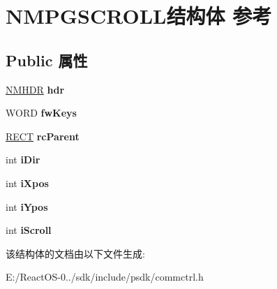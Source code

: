 \hypertarget{struct_n_m_p_g_s_c_r_o_l_l}{}\section{N\+M\+P\+G\+S\+C\+R\+O\+L\+L结构体 参考}
\label{struct_n_m_p_g_s_c_r_o_l_l}
\subsection*{Public 属性}
\begin{DoxyCompactItemize}
\item 
\mbox{\label{struct_n_m_p_g_s_c_r_o_l_l_ae7c7c149c351f461de64fbb294d3bf6d}} 
\hyperlink{structtag_n_m_h_d_r}{N\+M\+H\+DR} {\bfseries hdr}
\item 
\mbox{\label{struct_n_m_p_g_s_c_r_o_l_l_a29cd28194be55f1b6ce7b4878edfa7b0}} 
W\+O\+RD {\bfseries fw\+Keys}
\item 
\mbox{\label{struct_n_m_p_g_s_c_r_o_l_l_a5d3d8c6729d978379c85c202d4b8427a}} 
\hyperlink{structtag_r_e_c_t}{R\+E\+CT} {\bfseries rc\+Parent}
\item 
\mbox{\label{struct_n_m_p_g_s_c_r_o_l_l_a08a0e51293fcef8cfd11e1b382b77cfc}} 
int {\bfseries i\+Dir}
\item 
\mbox{\label{struct_n_m_p_g_s_c_r_o_l_l_a4f5b4a20877e8ad2859f748602fb930d}} 
int {\bfseries i\+Xpos}
\item 
\mbox{\label{struct_n_m_p_g_s_c_r_o_l_l_a137906aae037c521e8c68dbf08a34ac7}} 
int {\bfseries i\+Ypos}
\item 
\mbox{\label{struct_n_m_p_g_s_c_r_o_l_l_ac61583422b1af7531042a9bf359951f8}} 
int {\bfseries i\+Scroll}
\end{DoxyCompactItemize}


该结构体的文档由以下文件生成\+:\begin{DoxyCompactItemize}
\item 
E\+:/\+React\+O\+S-\/0../sdk/include/psdk/commctrl.\+h\end{DoxyCompactItemize}
